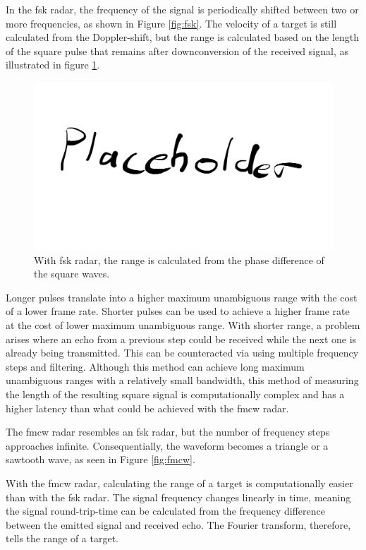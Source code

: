 In the \gls{fsk} radar,
the frequency of the signal is periodically shifted between two or more frequencies,
as shown in Figure \ref{fig:fsk}.
The velocity of a target is still calculated from the Doppler-shift,
but the range is calculated based on the length of the square pulse
that remains after downconversion of the received signal,
as illustrated in figure \ref{fig:fsk_range}.

\begin{figure}
    \centering
    \includegraphics[width=\textwidth]{fig/placeholder.png}
    \caption{With \gls{fsk} radar, 
        the range is calculated from the phase difference of the square waves.}
    \label{fig:fsk_range}
\end{figure}

Longer pulses translate into a higher maximum unambiguous range
with the cost of a lower frame rate.
Shorter pulses can be used to achieve a higher frame rate 
at the cost of lower maximum unambiguous range.
With shorter range, 
a problem arises where an echo from a previous step could be received
while the next one is already being transmitted.
This can be counteracted via using multiple frequency steps and filtering.
Although this method can achieve long maximum unambiguous ranges with a relatively small bandwidth,
this method of measuring the length of the resulting square signal is computationally complex
and has a higher latency than what could be achieved with the \gls{fmcw} radar.

The \gls{fmcw} radar resembles an \gls{fsk} radar,
but the number of frequency steps approaches infinite.
Consequentially, the waveform becomes a triangle or a sawtooth wave,
as seen in Figure \ref{fig:fmcw}.

With the \gls{fmcw} radar,
calculating the range of a target is computationally easier than with the \gls{fsk} radar.
The signal frequency changes linearly in time,
meaning the signal round-trip-time can be calculated from the frequency difference
between the emitted signal and received echo.
The Fourier transform, therefore, tells the range of a target.

